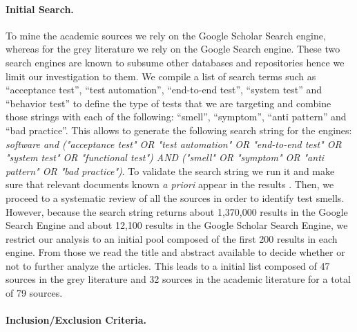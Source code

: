 \paragraph{\textbf{Initial Search.}}

To mine the academic sources we rely on the Google Scholar Search engine, whereas for the grey literature we rely on the Google Search engine. These two search engines are known to subsume other databases and repositories hence we limit our investigation to them. We compile a list of search terms such as ``acceptance test'', ``test automation'', ``end-to-end test'', ``system test'' and ``behavior test'' to define the type of tests that we are targeting and combine those strings with each of the following: ``smell'', ``symptom'', ``anti pattern'' and ``bad practice''. This allows to generate the following search string for the engines: \emph{software and ("acceptance test" OR "test automation" OR "end-to-end test" OR "system test" OR "functional test") AND ("smell" OR "symptom" OR "anti pattern" OR "bad practice")}. To validate the search string we run it and make sure that relevant documents known \emph{a priori} appear in the results \cite{Kitchenham2007, Ricca2021}. 
Then, we proceed to a systematic review of all the sources in order to identify test smells. However, because the search string returns about 1,370,000 results in the Google Search Engine and about 12,100 results in the Google Scholar Search Engine, we restrict our analysis to an initial pool composed of the first 200 results in each engine. From those we read the title and abstract available to decide whether or not to further analyze the articles. This leads to a initial list composed of 47 sources in the grey literature and 32 sources in the academic literature for a total of 79 sources.

\paragraph{\textbf{Inclusion/Exclusion Criteria.}}

